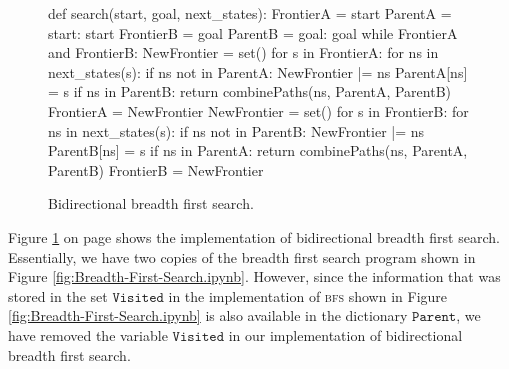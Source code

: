 \begin{figure}[!ht]
\centering
\begin{python3code}
    def search(start, goal, next_states):        
        FrontierA = { start }
        ParentA   = { start: start}
        FrontierB = { goal }
        ParentB   = { goal: goal} 
        while FrontierA and FrontierB:
            NewFrontier = set()
            for s in FrontierA:
                for ns in next_states(s):
                    if ns not in ParentA:
                        NewFrontier |= { ns }
                        ParentA[ns]  = s
                        if ns in ParentB:
                            return combinePaths(ns, ParentA, ParentB)
            FrontierA   = NewFrontier
            NewFrontier = set()
            for s in FrontierB:
                for ns in next_states(s):
                    if ns not in ParentB:
                        NewFrontier |= { ns }
                        ParentB[ns]  = s
                        if ns in ParentA:
                            return combinePaths(ns, ParentA, ParentB)
            FrontierB = NewFrontier
\end{python3code}
\vspace*{-0.3cm}
\caption{Bidirectional breadth first search.}
\label{fig:Bidirectional-BFS.ipynb}
\end{figure}

Figure \ref{fig:Bidirectional-BFS.ipynb} on page \pageref{fig:Bidirectional-BFS.ipynb} shows the implementation
of bidirectional breadth first search.  Essentially, we have two copies of the breadth first search program shown in
Figure \ref{fig:Breadth-First-Search.ipynb}.  However, since the information that was stored in the set
$\texttt{Visited}$ in the implementation of \textsc{bfs} shown in Figure \ref{fig:Breadth-First-Search.ipynb} is
also available in the dictionary $\texttt{Parent}$, we have removed the variable $\texttt{Visited}$ in our
implementation of bidirectional breadth first search.

